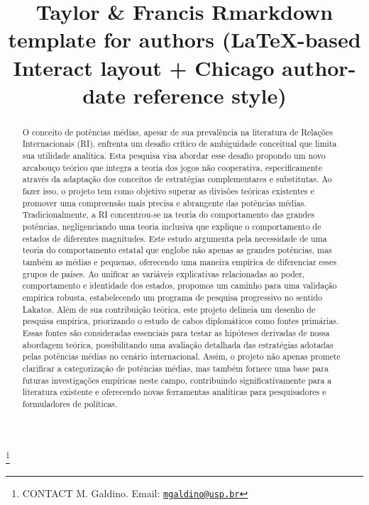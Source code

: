 \documentclass[]{interact}
\theoremstyle{plain}%
\theoremstyle{definition}
\theoremstyle{remark}
\begin{document}

\title{Taylor \& Francis Rmarkdown template for authors (\LaTeX-based
\textsf{Interact} layout + Chicago author-date reference style)}


\author{
}

\thanks{CONTACT M.
Galdino. Email: \href{mailto:mgaldino@usp.br}{\nolinkurl{mgaldino@usp.br}}}

\maketitle

\begin{abstract}
O conceito de potências médias, apesar de sua prevalência na literatura
de Relações Internacionais (RI), enfrenta um desafio crítico de
ambiguidade conceitual que limita sua utilidade analítica. Esta pesquisa
visa abordar esse desafio propondo um novo arcabouço teórico que integra
a teoria dos jogos não cooperativa, especificamente através da adaptação
dos conceitos de estratégias complementares e substitutas. Ao fazer
isso, o projeto tem como objetivo superar as divisões teóricas
existentes e promover uma compreensão mais precisa e abrangente das
potências médias. Tradicionalmente, a RI concentrou-se na teoria do
comportamento das grandes potências, negligenciando uma teoria inclusiva
que explique o comportamento de estados de diferentes magnitudes. Este
estudo argumenta pela necessidade de uma teoria do comportamento estatal
que englobe não apenas as grandes potências, mas também as médias e
pequenas, oferecendo uma maneira empírica de diferenciar esses grupos de
países. Ao unificar as variáveis explicativas relacionadas ao poder,
comportamento e identidade dos estados, propomos um caminho para uma
validação empírica robusta, estabelecendo um programa de pesquisa
progressivo no sentido Lakatos. Além de sua contribuição teórica, este
projeto delineia um desenho de pesquisa empírica, priorizando o estudo
de cabos diplomáticos como fontes primárias. Essas fontes são
consideradas essenciais para testar as hipóteses derivadas de nossa
abordagem teórica, possibilitando uma avaliação detalhada das
estratégias adotadas pelas potências médias no cenário internacional.
Assim, o projeto não apenas promete clarificar a categorização de
potências médias, mas também fornece uma base para futuras investigações
empíricas neste campo, contribuindo significativamente para a literatura
existente e oferecendo novas ferramentas analíticas para pesquisadores e
formuladores de políticas.
\end{abstract}
\end{document}
